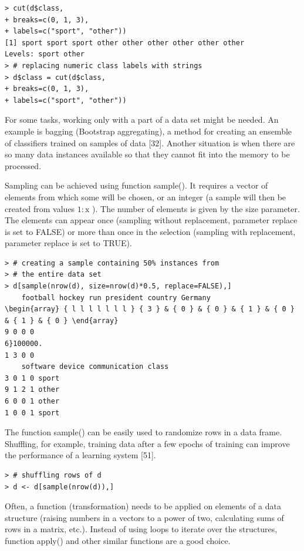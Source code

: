 \documentclass[10pt]{book}
\begin{document}
\begin{verbatim}
> cut(d$class,
+ breaks=c(0, 1, 3),
+ labels=c("sport", "other"))
[1] sport sport sport other other other other other other
Levels: sport other
> # replacing numeric class labels with strings
> d$class = cut(d$class,
+ breaks=c(0, 1, 3),
+ labels=c("sport", "other"))
\end{verbatim}

For some tasks, working only with a part of a data set might be needed. An example is bagging (Bootstrap aggregating), a method for creating an ensemble of classifiers trained on samples of data [32]. Another situation is when there are so many data instances available so that they cannot fit into the memory to be processed.

Sampling can be achieved using function sample(). It requires a vector of elements from which some will be chosen, or an integer (a sample will then be created from values $1: \mathrm{x}$ ). The number of elements is given by the size parameter. The elements can appear once (sampling without replacement, parameter replace is set to FALSE) or more than once in the selection (sampling with replacement, parameter replace is set to TRUE).

\begin{verbatim}
> # creating a sample containing 50% instances from
> # the entire data set
> d[sample(nrow(d), size=nrow(d)*0.5, replace=FALSE),]
    football hockey run president country Germany
\begin{array} { l l l l l l l } { 3 } & { 0 } & { 0 } & { 1 } & { 0 } & { 1 } & { 0 } \end{array}
9 0 0 0 
6}100000.
1 3 0 0 
    software device communication class
3 0 1 0 sport
9 1 2 1 other
6 0 0 1 other
1 0 0 1 sport
\end{verbatim}

The function sample() can be easily used to randomize rows in a data frame. Shuffling, for example, training data after a few epochs of training can improve the performance of a learning system [51].

\begin{verbatim}
> # shuffling rows of d
> d <- d[sample(nrow(d)),]
\end{verbatim}

Often, a function (transformation) needs to be applied on elements of a data structure (raising numbers in a vectors to a power of two, calculating sums of rows in a matrix, etc.). Instead of using loops to iterate over the structures, function apply() and other similar functions are a good choice.
\end{document}
